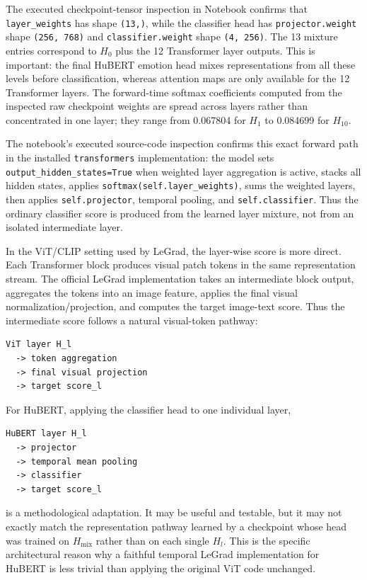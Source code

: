 \documentclass[11pt]{article}
\begin{document}
The executed checkpoint-tensor inspection in Notebook
 confirms that
\texttt{layer\_weights} has shape \texttt{(13,)}, while the classifier head has
\texttt{projector.weight} shape \texttt{(256, 768)} and
\texttt{classifier.weight} shape \texttt{(4, 256)}. The 13 mixture entries
correspond to $H_0$ plus the 12 Transformer layer outputs. This is important:
the final HuBERT emotion head mixes representations from all these levels
before classification, whereas attention maps are only available for the 12
Transformer layers. The forward-time softmax coefficients computed from the
inspected raw checkpoint weights are spread across layers rather than
concentrated in one layer; they range from 0.067804 for $H_1$ to 0.084699 for
$H_{10}$.

The notebook's executed source-code inspection confirms this exact forward
path in the installed \texttt{transformers} implementation: the model sets
\texttt{output\_hidden\_states=True} when weighted layer aggregation is active,
stacks all hidden states, applies \texttt{softmax(self.layer\_weights)}, sums
the weighted layers, then applies \texttt{self.projector}, temporal pooling, and
\texttt{self.classifier}. Thus the ordinary classifier score is produced from
the learned layer mixture, not from an isolated intermediate layer.

In the ViT/CLIP setting used by LeGrad, the layer-wise score is more direct.
Each Transformer block produces visual patch tokens in the same representation
stream. The official LeGrad implementation takes an intermediate block output,
aggregates the tokens into an image feature, applies the final visual
normalization/projection, and computes the target image-text score. Thus the
intermediate score follows a natural visual-token pathway:

\begin{verbatim}
ViT layer H_l
  -> token aggregation
  -> final visual projection
  -> target score_l
\end{verbatim}

For HuBERT, applying the classifier head to one individual layer,

\begin{verbatim}
HuBERT layer H_l
  -> projector
  -> temporal mean pooling
  -> classifier
  -> target score_l
\end{verbatim}

is a methodological adaptation. It may be useful and testable, but it may not
exactly match the representation pathway learned by a checkpoint whose head was
trained on $H_{\mathrm{mix}}$ rather than on each single $H_l$. This is the
specific architectural reason why a faithful temporal LeGrad implementation for
HuBERT is less trivial than applying the original ViT code unchanged.
\end{document}
